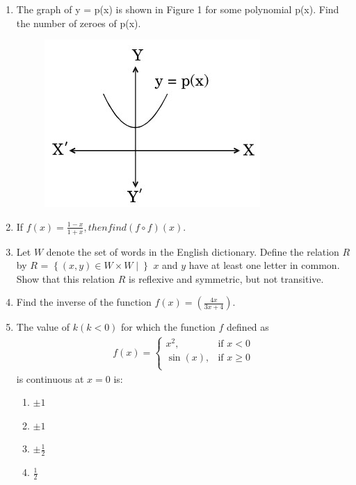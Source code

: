 \documentclass{article}
\providecommand{\cbrak}[1]{\ensuremath{\left\{#1\right\}}}
\begin{document}
\begin{enumerate}

\item The graph of y = p(x) is shown in Figure 1 for some polynomial p(x). Find the number of zeroes of p(x).

\begin{figure}[h]
\centering
\includegraphics[width=0.4\columnwidth]{ques8.jpg}
\caption{}
\end{figure}

\item If $f(x) = \frac{1-x}{1+x}, then find (f\circ f)(x)$.


\item Let $W$ denote the set of words in the English dictionary. Define the relation $R$ by
$R$ = $\cbrak{(x, y) \in W \times W \mid}$ $x$ and $y$ have at least one letter in common.
Show that this relation $R$ is reflexive and symmetric, but not transitive.

\item Find the inverse of the function $f(x) = (\frac{4x}{3x+4})$.

\item The value of $k(k < 0)$ for which the function $f$ defined as 
\begin{align*}
f(x) = \begin{cases}
x^2, & \text{if } x < 0 \\
\sin(x), & \text{if } x \geq 0  \\
\end{cases}
\end{align*}
is continuous at $x = 0$ is:

\begin{enumerate}
     \item $\pm1$ 

     \item $\pm1$ 

     \item  $\pm\frac{1}{2}$ 

     \item  $\frac{1}{2}$ 

\end{enumerate}



\end{enumerate}
\end{document}

